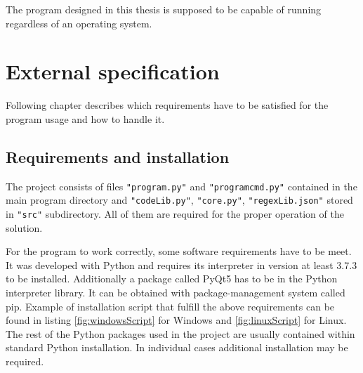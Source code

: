 \documentclass[a4paper,twoside,12pt]{book}
\begin{document}
The program designed in this thesis is supposed to be capable of running regardless of an operating system.



\chapter{External specification}

Following chapter describes which requirements have to be satisfied for the program usage and how to handle it.

\section{Requirements and installation}

The project consists of files \lstinline|"program.py"| and \lstinline|"programcmd.py"| contained in the main program directory and
\lstinline|"codeLib.py"|, \lstinline|"core.py"|, \lstinline|"regexLib.json"| stored in \lstinline|"src"| subdirectory. All of them are 
required for the proper operation of the solution.

For the program to work correctly, some software requirements have to be meet. It was developed with 
Python and requires its interpreter in version at least 3.7.3 to be installed. Additionally a package called PyQt5 has 
to be in the Python interpreter library. It can be obtained with package-management 
system called pip. Example of installation script that fulfill the above requirements can be found
in listing \ref{fig:windowsScript} for Windows and \ref{fig:linuxScript} for Linux.
The rest of the Python packages used in the project are usually contained within standard Python installation.
In individual cases additional installation may be required.
\end{document}
